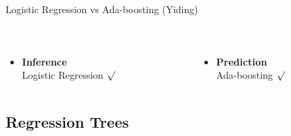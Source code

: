 \documentclass[table]{beamer}\usepackage[]{graphicx}\usepackage[]{color}
\begin{document}
\begin{frame}{Logistic Regression vs Ada-boosting (Yiding)}
\begin{columns}[t]
\begin{column}[t]{8cm}
\begin{table}[ht]
{\begin{tabular}{ccccc}
\end{tabular}
}
\end{table}
\end{column}
\end{columns}


\begin{minipage}{\textwidth}
{\fontsize{0.3cm}{1em}\selectfont
\begin{columns}[t]


\begin{column}[t]{4cm}
\begin{itemize}
\item \textbf{Inference}\\
Logistic Regression $\surd$
\end{itemize}
\end{column}


\begin{column}[t]{8cm}
\begin{itemize}
\item \textbf{Prediction}\\
Ada-boosting $\surd$
\end{itemize}
\end{column}


\end{columns}
}
\end{minipage}


\end{frame}


\subsection{Regression Trees}

\end{document}
